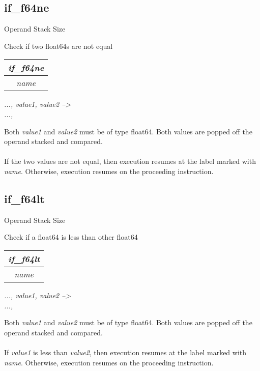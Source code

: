 \documentclass[12pt]{article}
\begin{document}
		\subsection*{if\_f64ne}
			\begin{labeling}{Operand Stack Size}
				\item [\textbf{Operation}] Check if two float64s are not equal 
				\item [\textbf{Format}] \begin{tabular}{| c |} \hline \textit{if\_f64ne} \\ \hline \textit{name} \\ \hline \end{tabular}
				\item [\textbf{Operand Stack}] \textit{..., value1, value2 --\textgreater} \\
										\textit{..., }
				\item [\textbf{Description}] Both \textit{value1} and \textit{value2} must be of type float64. Both values are popped off the operand stacked and compared. \\ \\
				If the two values are not equal, then execution resumes at the label marked with \textit{name}. Otherwise, execution resumes on the proceeding instruction. 
			\end{labeling}	
		\newpage
		
		\subsection*{if\_f64lt}
			\begin{labeling}{Operand Stack Size}
				\item [\textbf{Operation}] Check if a float64 is less than other float64
				\item [\textbf{Format}] \begin{tabular}{| c |} \hline \textit{if\_f64lt} \\ \hline \textit{name} \\ \hline \end{tabular}
				\item [\textbf{Operand Stack}] \textit{..., value1, value2 --\textgreater} \\
										\textit{..., }
				\item [\textbf{Description}] Both \textit{value1} and \textit{value2} must be of type float64. Both values are popped off the operand stacked and compared. \\ \\
				If \textit{value1} is less than \textit{value2}, then execution resumes at the label marked with \textit{name}. Otherwise, execution resumes on the proceeding instruction. 
			\end{labeling}	
		\newpage
		
\end{document}
